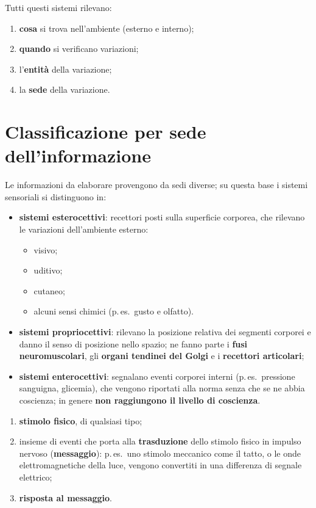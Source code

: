 Tutti questi sistemi rilevano:
\begin{enumerate}
  \item \textbf{cosa} si trova nell'ambiente (esterno e interno);
  \item \textbf{quando} si verificano variazioni;
  \item l'\textbf{entità} della variazione;
  \item la \textbf{sede} della variazione.
\end{enumerate}

\section{Classificazione per sede dell'informazione}

Le informazioni da elaborare provengono da sedi diverse; su questa base i sistemi sensoriali si
distinguono in:

\begin{itemize}
  \item \textbf{sistemi esterocettivi}: recettori posti sulla superficie corporea, che rilevano le
    variazioni dell'ambiente esterno:
    \begin{itemize}
      \item visivo;
      \item uditivo;
      \item cutaneo;
      \item alcuni sensi chimici (p.\,es.\ gusto e olfatto).
    \end{itemize}
  \item \textbf{sistemi propriocettivi}: rilevano la posizione relativa dei segmenti corporei e
    danno il senso di posizione nello spazio; ne fanno parte i \textbf{fusi neuromuscolari}, gli
    \textbf{organi tendinei del Golgi} e i \textbf{recettori articolari};
  \item \textbf{sistemi enterocettivi}: segnalano eventi corporei interni (p.\,es.\ pressione
    sanguigna, glicemia), che vengono riportati alla norma senza che se ne abbia coscienza; in
    genere \textbf{non raggiungono il livello di coscienza}.
\end{itemize}

\begin{enumerate}
  \item \textbf{stimolo fisico}, di qualsiasi tipo;
  \item insieme di eventi che porta alla \textbf{trasduzione} dello stimolo fisico in impulso
    nervoso (\textbf{messaggio}): p.\,es.\ uno stimolo meccanico come il tatto, o le onde
    elettromagnetiche della luce, vengono convertiti in una differenza di segnale elettrico;
  \item \textbf{risposta al messaggio}.
\end{enumerate}

